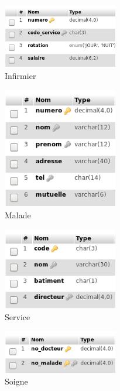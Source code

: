 \begin{figure}
 \centering
 \includegraphics[width=5cm]{./Ehopital_6.fig.png}
 \caption{Infirmier}
 \label{fig:hop_6}
\end{figure}
\begin{figure}
 \centering
 \includegraphics[width=5cm]{./Ehopital_7.fig.png}
 \caption{Malade}
 \label{fig:hop_7}
\end{figure}
\begin{figure}
 \centering
 \includegraphics[width=5cm]{./Ehopital_8.fig.png}
 \caption{Service}
 \label{fig:hop_8}
\end{figure}
\begin{figure}
 \centering
 \includegraphics[width=5cm]{./Ehopital_9.fig.png}
 \caption{Soigne}
 \label{fig:hop_9}
\end{figure}


